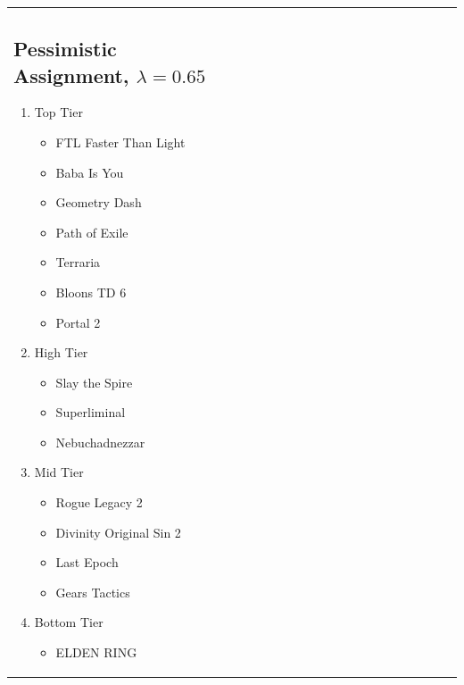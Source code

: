 \documentclass{article}
\begin{document}
\begin{enumerate}
\begin{tabular}{m{0.5\linewidth}m{0.5\linewidth}}
    \subsection*{Pessimistic Assignment, $\lambda = 0.65$}
    \begin{enumerate}
        \item Top Tier
            \begin{itemize}
                \item FTL Faster Than Light
                \item Baba Is You
                \item Geometry Dash
                \item Path of Exile
                \item Terraria
                \item Bloons TD 6
                \item Portal 2
            \end{itemize}
        \item High Tier
            \begin{itemize}
                \item Slay the Spire
                \item Superliminal
                \item Nebuchadnezzar
            \end{itemize}
        \item Mid Tier
            \begin{itemize}
                \item Rogue Legacy 2
                \item Divinity Original Sin 2
                \item Last Epoch
                \item Gears Tactics
            \end{itemize}
        \item Bottom Tier
            \begin{itemize}
                \item ELDEN RING
            \end{itemize}
    \end{enumerate} &

\end{tabular}
\end{enumerate}
\end{document}
